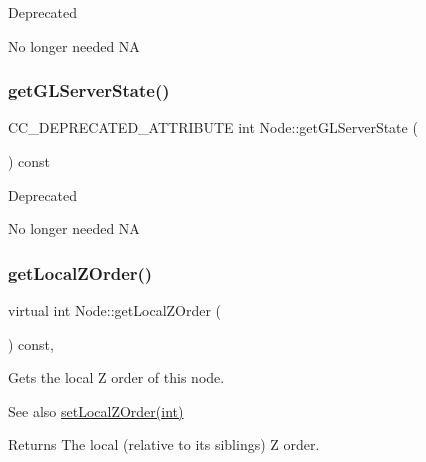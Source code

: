 \begin{DoxyRefDesc}{Deprecated}
\item[\hyperlink{deprecated__deprecated000030}{Deprecated}]No longer needed  NA \end{DoxyRefDesc}
\mbox{\label{classNode_a4817ce95fa64827e8a58645e5b5854ae}} 
\subsubsection{\texorpdfstring{get\+G\+L\+Server\+State()}{getGLServerState()}\hspace{0.1cm}{\footnotesize\ttfamily [2/2]}}
{\footnotesize\ttfamily C\+C\+\_\+\+D\+E\+P\+R\+E\+C\+A\+T\+E\+D\+\_\+\+A\+T\+T\+R\+I\+B\+U\+TE int Node\+::get\+G\+L\+Server\+State (\begin{DoxyParamCaption}{ }\end{DoxyParamCaption}) const\hspace{0.3cm}{\ttfamily [inline]}}

\begin{DoxyRefDesc}{Deprecated}
\item[\hyperlink{deprecated__deprecated000260}{Deprecated}]No longer needed  NA \end{DoxyRefDesc}
\mbox{\label{classNode_a9a9c743ae124b0c1a2d6f0a28a1f06dd}} 
\subsubsection{\texorpdfstring{get\+Local\+Z\+Order()}{getLocalZOrder()}\hspace{0.1cm}{\footnotesize\ttfamily [1/2]}}
{\footnotesize\ttfamily virtual int Node\+::get\+Local\+Z\+Order (\begin{DoxyParamCaption}{ }\end{DoxyParamCaption}) const\hspace{0.3cm}{\ttfamily [inline]}, {\ttfamily [virtual]}}

Gets the local Z order of this node.

\begin{DoxySeeAlso}{See also}
{\ttfamily \hyperlink{classNode_aee4e616c2d55b722226aae1e68b4946f}{set\+Local\+Z\+Order(int)}}
\end{DoxySeeAlso}
\begin{DoxyReturn}{Returns}
The local (relative to its siblings) Z order. 
\end{DoxyReturn}
\mbox{\label{classNode_a03f41047bd53b12c645a429246e31ea4}} 
